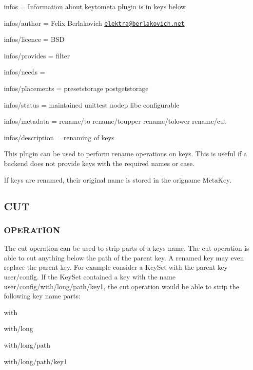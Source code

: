 
\begin{DoxyItemize}
\item infos = Information about keytometa plugin is in keys below
\item infos/author = Felix Berlakovich \href{mailto:elektra@berlakovich.net}{\tt elektra@berlakovich.\+net}
\item infos/licence = B\+S\+D
\item infos/provides = filter
\item infos/needs =
\item infos/placements = presetstorage postgetstorage
\item infos/status = maintained unittest nodep libc configurable
\item infos/metadata = rename/to rename/toupper rename/tolower rename/cut
\item infos/description = renaming of keys
\end{DoxyItemize}

This plugin can be used to perform rename operations on keys. This is useful if a backend does not provide keys with the required names or case.

If keys are renamed, their original name is stored in the {\ttfamily origname} Meta\+Key.

\subsection*{C\+U\+T}

\subsubsection*{O\+P\+E\+R\+A\+T\+I\+O\+N}

The cut operation can be used to strip parts of a keys name. The cut operation is able to cut anything below the path of the parent key. A renamed key may even replace the parent key. For example consider a Key\+Set with the parent key {\ttfamily user/config}. If the Key\+Set contained a key with the name {\ttfamily user/config/with/long/path/key1}, the cut operation would be able to strip the following key name parts\+:
\begin{DoxyItemize}
\item with
\item with/long
\item with/long/path
\item with/long/path/key1
\end{DoxyItemize}

